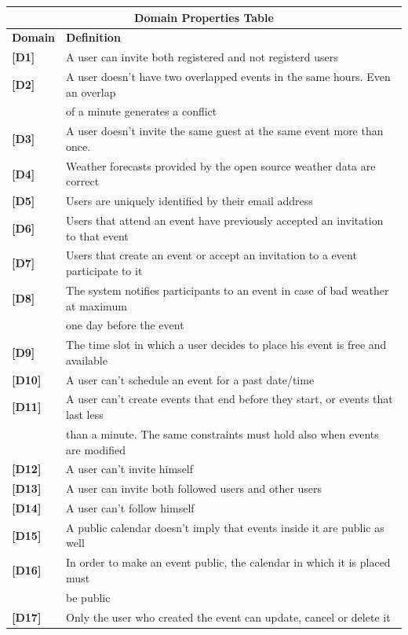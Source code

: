 \documentclass[12pt]{book}
\begin{document}
\begin{tabular}{ |l|l| }
  		\hline
  		\hline
  		\multicolumn{2}{|c|}{\large{\textbf{Domain Properties Table}}} \\
  		\hline
  		\hline
  		\textbf{Domain } & \textbf{Definition} \\ 
  		\hline
  			\textbf{[D1]} & A user can invite both registered and not registerd users\\
 		 	\textbf{[D2]} & A user doesn't have two overlapped events in the same hours. Even an overlap \\ & of a minute generates a conflict\\
			\textbf{[D3]} & A user doesn't invite the same guest at the same event more than once. \\
			\textbf{[D4]} & Weather forecasts provided by the open source weather data are correct \\
			\textbf{[D5]} & Users are uniquely identified by their email address \\
			\textbf{[D6]} & Users that attend an event have previously accepted an invitation to that event \\
			\textbf{[D7]} & Users that create an event or accept an invitation to a event participate to it \\
			\textbf{[D8]} & The system notifies participants to an event in case of bad weather at maximum\\ & one day before the event \\
			\textbf{[D9]} & The time slot in which a user decides to place his event is free and available \\
			\textbf{[D10]} & A user can't schedule an event for a past date/time\\
			\textbf{[D11]} & A user can't create events that end before they start, or events that last less \\ &than a minute. The same constraints must hold also when events are modified\\
			\textbf{[D12]} & A user can't invite himself\\
			\textbf{[D13]} & A user can invite both followed users and other users\\
			\textbf{[D14]} & A user can't follow himself \\
			\textbf{[D15]} & A public calendar doesn't imply that events inside it are public as well \\
			\textbf{[D16]} & In order to make an event public, the calendar in which it is placed must\\&be public\\
			\textbf{[D17]} & Only the user who created the event can update, cancel or delete it\\
  		\hline 
  		\hline
	\end{tabular} \\ 
\end{document}
